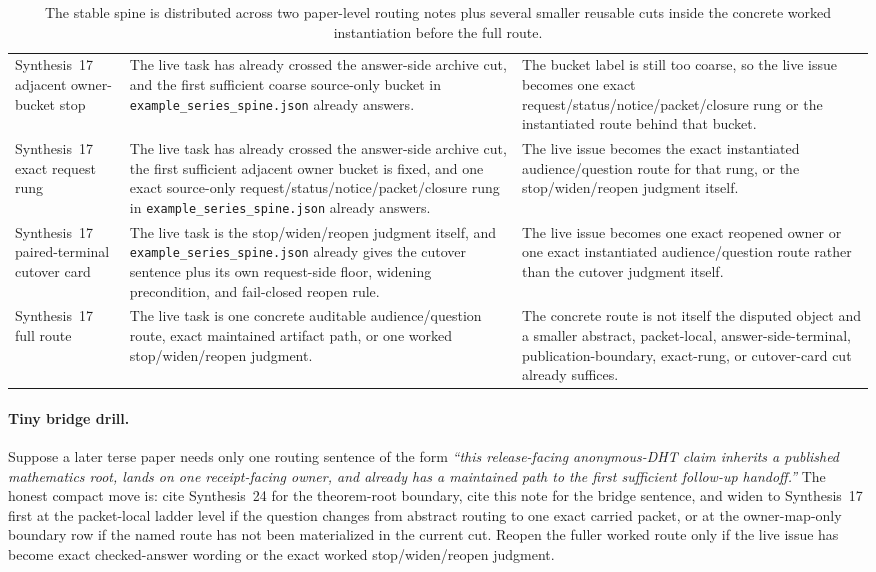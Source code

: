 \documentclass[11pt]{article}
\begin{document}
\begin{table}[t]
\begin{tabularx}{\linewidth}{@{}L Y Y@{}}
Synthesis~17 adjacent owner-bucket stop & The live task has already crossed the answer-side archive cut, and the first sufficient coarse source-only bucket in \nolinkurl{example\_series\_spine.json} already answers. & The bucket label is still too coarse, so the live issue becomes one exact request/status/notice/packet/closure rung or the instantiated route behind that bucket. \\
Synthesis~17 exact request rung & The live task has already crossed the answer-side archive cut, the first sufficient adjacent owner bucket is fixed, and one exact source-only request/status/notice/packet/closure rung in \nolinkurl{example\_series\_spine.json} already answers. & The live issue becomes the exact instantiated audience/question route for that rung, or the stop/widen/reopen judgment itself. \\
Synthesis~17 paired-terminal cutover card & The live task is the stop/widen/reopen judgment itself, and \nolinkurl{example\_series\_spine.json} already gives the cutover sentence plus its own request-side floor, widening precondition, and fail-closed reopen rule. & The live issue becomes one exact reopened owner or one exact instantiated audience/question route rather than the cutover judgment itself. \\
Synthesis~17 full route & The live task is one concrete auditable audience/question route, exact maintained artifact path, or one worked stop/widen/reopen judgment. & The concrete route is not itself the disputed object and a smaller abstract, packet-local, answer-side-terminal, publication-boundary, exact-rung, or cutover-card cut already suffices. \\
\bottomrule
\end{tabularx}
\caption{The stable spine is distributed across two paper-level routing notes plus several smaller reusable cuts inside the concrete worked instantiation before the full route.}
\label{tab:seriesspine-three-surface}
\end{table}

\paragraph{Tiny bridge drill.}
Suppose a later terse paper needs only one routing sentence of the form \emph{``this release-facing anonymous-DHT claim inherits a published mathematics root, lands on one receipt-facing owner, and already has a maintained path to the first sufficient follow-up handoff.''} The honest compact move is: cite Synthesis~24 for the theorem-root boundary, cite this note for the bridge sentence, and widen to Synthesis~17 first at the packet-local ladder level if the question changes from abstract routing to one exact carried packet, or at the owner-map-only boundary row if the named route has not been materialized in the current cut. Reopen the fuller worked route only if the live issue has become exact checked-answer wording or the exact worked stop/widen/reopen judgment.\cite{series:mathcrosswalk,series:workedexample}
\end{document}

